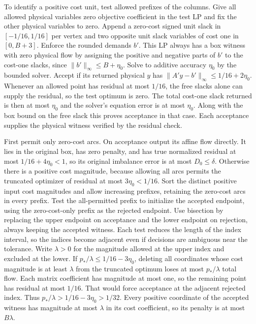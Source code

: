 \documentclass[11pt]{article}
\begin{document}
To identify a positive cost unit, test allowed prefixes of the columns. Give all allowed physical variables zero objective coefficient in the test LP and fix the other physical variables to zero. Append a zero-cost signed unit slack in \([-1/16,1/16]\) per vertex and two opposite unit slack variables of cost one in \([0,B+3]\). Enforce the rounded demands \(b'\). This LP always has a box witness with zero physical flow by assigning the positive and negative parts of \(b'\) to the cost-one slacks, since \(\|b'\|_\infty\le B+\eta_0\). Solve to additive accuracy \(\eta_0\) by the bounded solver. Accept if its returned physical \(y\) has \(\|A'y-b'\|_\infty\le1/16+2\eta_0\). Whenever an allowed point has residual at most \(1/16\), the free slacks alone can supply the residual, so the test optimum is zero. The total cost-one slack returned is then at most \(\eta_0\) and the solver's equation error is at most \(\eta_0\). Along with the box bound on the free slack this proves acceptance in that case. Each acceptance supplies the physical witness verified by the residual check.

First permit only zero-cost arcs. On acceptance output its affine flow directly. It lies in the original box, has zero penalty, and has true normalized residual at most \(1/16+4\eta_0<1\), so its original imbalance error is at most \(D_0\le\delta\). Otherwise there is a positive cost magnitude, because allowing all arcs permits the truncated optimizer of residual at most \(3\eta_0<1/16\). Sort the distinct positive input cost magnitudes and allow increasing prefixes, retaining the zero-cost arcs in every prefix. Test the all-permitted prefix to initialize the accepted endpoint, using the zero-cost-only prefix as the rejected endpoint. Use bisection by replacing the upper endpoint on acceptance and the lower endpoint on rejection, always keeping the accepted witness. Each test reduces the length of the index interval, so the indices become adjacent even if decisions are ambiguous near the tolerance. Write \(\lambda>0\) for the magnitude allowed at the upper index and excluded at the lower. If \(p_*/\lambda\le1/16-3\eta_0\), deleting all coordinates whose cost magnitude is at least \(\lambda\) from the truncated optimum loses at most \(p_*/\lambda\) total flow. Each matrix coefficient has magnitude at most one, so the remaining point has residual at most \(1/16\). That would force acceptance at the adjacent rejected index. Thus \(p_*/\lambda>1/16-3\eta_0>1/32\). Every positive coordinate of the accepted witness has magnitude at most \(\lambda\) in its cost coefficient, so its penalty is at most \(B\lambda\).
\end{document}
